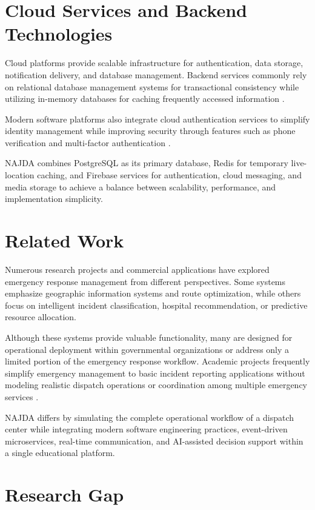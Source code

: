 \section{Cloud Services and Backend Technologies}

Cloud platforms provide scalable infrastructure for authentication, data storage, notification delivery, and database management. Backend services commonly rely on relational database management systems for transactional consistency while utilizing in-memory databases for caching frequently accessed information \cite{postgresql,redis}.

Modern software platforms also integrate cloud authentication services to simplify identity management while improving security through features such as phone verification and multi-factor authentication \cite{firebase}.

NAJDA combines PostgreSQL as its primary database, Redis for temporary live-location caching, and Firebase services for authentication, cloud messaging, and media storage to achieve a balance between scalability, performance, and implementation simplicity.

\section{Related Work}

Numerous research projects and commercial applications have explored emergency response management from different perspectives. Some systems emphasize geographic information systems and route optimization, while others focus on intelligent incident classification, hospital recommendation, or predictive resource allocation.

Although these systems provide valuable functionality, many are designed for operational deployment within governmental organizations or address only a limited portion of the emergency response workflow. Academic projects frequently simplify emergency management to basic incident reporting applications without modeling realistic dispatch operations or coordination among multiple emergency services \cite{pressman2020se,sommerville2016software}.

NAJDA differs by simulating the complete operational workflow of a dispatch center while integrating modern software engineering practices, event-driven microservices, real-time communication, and AI-assisted decision support within a single educational platform.

\section{Research Gap}

